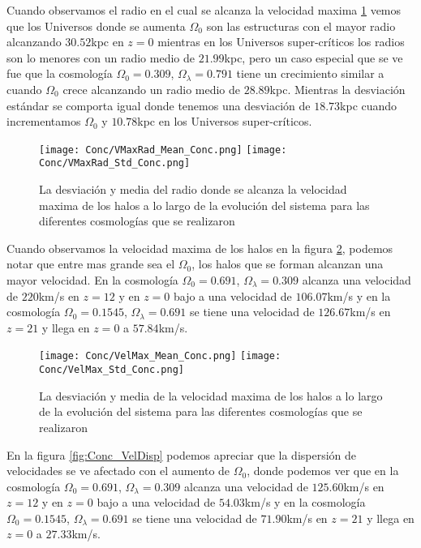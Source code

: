 Cuando observamos el radio en el cual se alcanza la velocidad maxima \ref{fig:Conc_VMaxRad} vemos que los Universos donde se aumenta $\Omega_0$ son las estructuras con el mayor radio alcanzando $30.52$kpc en $z=0$ mientras en los Universos super-críticos los radios son lo menores con un radio medio de $21.99$kpc, pero un caso especial que se ve fue que la cosmología $\Omega_0 =0.309$, $\Omega_\lambda=0.791$ tiene un crecimiento similar a cuando $\Omega_0$ crece alcanzando  un radio medio de $28.89$kpc. Mientras la desviación estándar se comporta igual donde tenemos una desviación de $18.73$kpc cuando incrementamos $\Omega_0$ y $10.78$kpc en los Universos super-críticos.

\begin{figure}[H]
      \centering
      \texttt{[image: Conc/VMaxRad\_Mean\_Conc.png]}
      \texttt{[image: Conc/VMaxRad\_Std\_Conc.png]}
      \caption[Evolución de la desviación y media del radio donde se alcanza la velocidad maxima de los halos para todas las cosmologías]{La desviación y media del radio donde se alcanza la velocidad maxima de los halos a lo largo de la evolución del sistema para las diferentes cosmologías que se realizaron}
      \label{fig:Conc_VMaxRad}
\end{figure}

Cuando observamos la velocidad maxima de los halos en la figura \ref{fig:Conc_VelMax}, podemos notar que entre mas grande sea el $\Omega_0$, los halos que se forman alcanzan una mayor velocidad. En la cosmología $\Omega_0 = 0.691$, $\Omega_\lambda = 0.309$ alcanza una velocidad de $220$km/s en $z=12$ y en $z=0$ bajo a una velocidad de $106.07$km/s y en la cosmología  $\Omega_0 = 0.1545$, $\Omega_\lambda = 0.691$ se tiene una velocidad de $126.67$km/s en $z=21$ y llega en $z=0$ a $57.84$km/s.

\begin{figure}[H]
      \centering
      \texttt{[image: Conc/VelMax\_Mean\_Conc.png]}
      \texttt{[image: Conc/VelMax\_Std\_Conc.png]}
      \caption[Evolución de la desviación y media de la velocidad maxima de los halos para todas las cosmologías]{La desviación y media de la velocidad maxima de los halos a lo largo de la evolución del sistema para las diferentes cosmologías que se realizaron}
      \label{fig:Conc_VelMax}
\end{figure}

En la figura \ref{fig:Conc_VelDisp} podemos apreciar que la dispersión de velocidades se ve afectado con el aumento de $\Omega_0$, donde podemos ver que en la cosmología $\Omega_0 = 0.691$, $\Omega_\lambda = 0.309$ alcanza una velocidad de $125.60$km/s en $z=12$ y en $z=0$ bajo a una velocidad de $54.03$km/s y en la cosmología  $\Omega_0 = 0.1545$, $\Omega_\lambda = 0.691$ se tiene una velocidad de $71.90$km/s en $z=21$ y llega en $z=0$ a $27.33$km/s. 

